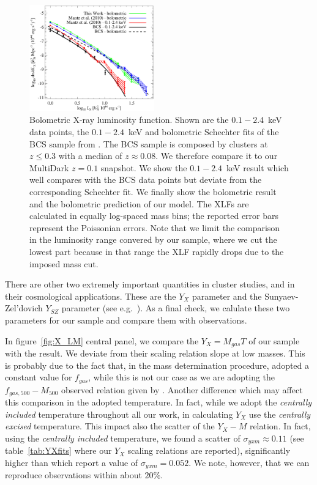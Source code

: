 \documentclass[traditabstract]{aa}
\begin{document}
\begin{figure}[hbt!]
\centering
\includegraphics[width=0.48\textwidth]{figures/xlf.eps}
\caption{Bolometric X-ray luminosity function. Shown are the $0.1-2.4$~keV data points, the $0.1-2.4$~keV and bolometric Schechter fits of the BCS sample from \cite{1997ApJ...479L.101E}. The BCS sample is composed by clusters at $z\leq0.3$ with a median of $z \approx 0.08$. We therefore compare it to our MultiDark $z=0.1$ snapshot. We show the \cite{2010MNRAS.406.1773M} $0.1-2.4$~keV result which well compares with the BCS data points but deviate from the corresponding Schechter fit. We finally show the \cite{2010MNRAS.406.1773M} bolometric result and the bolometric prediction of our model. The XLFs are calculated in equally log-spaced mass bins; the reported error bars represent the Poissonian errors. Note that we limit the comparison in the luminosity range convered by our sample, where we cut the lowest part because in that range the XLF rapidly drops due to the imposed mass cut.
}
\label{fig:XLF}
\end{figure}

There are other two extremely important quantities in cluster studies, and in their cosmological applications. These are the $Y_{X}$ parameter \citep{2006ApJ...650..128K} and the Sunyaev-Zel'dovich $Y_{SZ}$ parameter (see e.g.~\citealp{2002ARA&A..40..643C}). As a final check, we calulate these two parameters for our sample and compare them with observations.

In figure~\ref{fig:X_LM} central panel, we compare the $Y_{X} = M_{gas} T$ of our sample with the \cite{2010MNRAS.406.1773M} result. We deviate from their scaling relation slope at low masses. This is probably due to the fact that, in the mass determination procedure, \cite{2010MNRAS.406.1773M} adopted a constant value for $f_{gas}$, while this is not our case as we are adopting the $f_{gas,500}-M_{500}$ observed relation given by \cite{2009ApJ...693.1142S}. Another difference which may affect this comparison in the adopted temperature. In fact, while we adopt the \emph{centrally included} \cite{2010MNRAS.406.1773M} temperature throughout all our work, in calculating $Y_X$ \cite{2010MNRAS.406.1773M} use the \emph{centrally excised} temperature. This impact also the scatter of the $Y_{X}-M$ relation. In fact, using the \emph{centrally included} temperature, we found a scatter of $\sigma_{yxm} \approx 0.11$ (see table~\ref{tab:YXfits} where our $Y_X$ scaling relations are reported), significantly higher than \cite{2010MNRAS.406.1773M} which report a value of $\sigma_{yxm} = 0.052$. We note, however, that we can reproduce observations within about $20\%$.
\end{document}
